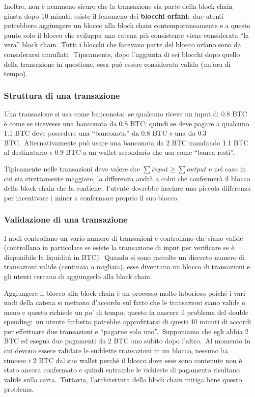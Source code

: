 Inoltre, non è nemmeno sicuro che la transazione sia parte della block chain giusta dopo 10 minuti; esiste il fenomeno dei \textbf{blocchi orfani}:\ due utenti potrebbero aggiungere un blocco alla block chain contemporaneamente e a questo punto solo il blocco che sviluppa una catena più consistente viene considerata ``la vera'' block chain.\
Tutti i blocchi che facevano parte del blocco orfano sono da considerarsi annullati.\
Tipicamente, dopo l'aggiunta di sei blocchi dopo quello della transazione in questione, essa può essere considerata valida (un'ora di tempo).

\subsubsection{Struttura di una transazione}

Una transazione si usa come banconota:\ se qualcuno riceve un input di 0.8 BTC è come se ricevesse una banconota da 0.8 BTC; quindi se deve pagare a qualcuno 1.1 BTC deve possedere una ``banconota'' da 0.8 BTC e una da 0.3 BTC.\
Alternativamente può usare una banconota da 2 BTC mandando 1.1 BTC al destinatario e 0.9 BTC a un wallet secondario che usa come ``banca resti''.

Tipicamente nelle transazioni deve valere che $\sum \mathit{input} \geq \sum \mathit{output}$ e nel caso in cui sia strettamente maggiore, la differenza andrà a colui che confermerà il blocco della block chain che la contiene:\ l'utente dovrebbe lasciare una piccola differenza per incentivare i miner a confermare proprio il suo blocco.\

\subsubsection{Validazione di una transazione}

I nodi controllano un vario numero di transazioni e controllano che siano valide (controllano in particolare se esiste la transazione di input per verificare se è disponibile la liquidità in BTC).\
Quando si sono raccolte un discreto numero di transazioni valide (centinaia o migliaia), esse diventano un blocco di transazioni e gli utenti cercano di aggiungerlo alla block chain.

Aggiungere il blocco alla block chain è un processo molto laborioso poiché i vari nodi della catena si mettono d'accordo sul fatto che le transazioni siano valide o meno e questo richiede un po' di tempo; questo fa nascere il problema del double spending:\ un utente furbetto potrebbe approfittarsi di questi 10 minuti di accordi per effettuare due transazioni e ``pagarne solo uno''.\
Supponiamo che egli abbia 2 BTC ed esegua due pagamenti da 2 BTC uno subito dopo l'altro.\
Al momento in cui devono essere validate le suddette transazioni in un blocco, nessuno ha rimosso i 2 BTC dal suo wallet perché il blocco dove esse sono contenute non è stato ancora confermato e quindi entrambe le richieste di pagamento risultano valide sulla carta.\
Tuttavia, l'architettura della block chain mitiga bene questo problema.

